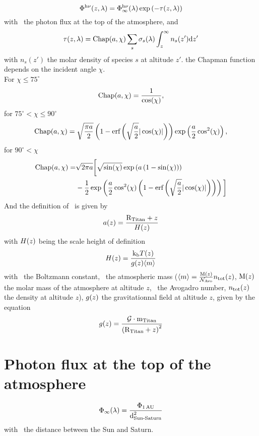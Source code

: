 \begin{equation}
\Phi^{\mathrm{h}\nu}(z,\lambda) = \Phi_\infty^{\mathrm{h}\nu}(\lambda) \exp\left(-\tau(z,\lambda)\right)
\end{equation}
with \fhvtop\ the photon flux at the top of the atmosphere, and
\begin{equation}
\tau(z,\lambda) = \text{Chap}(a,\chi)\sum_s\sigma_s(\lambda)\int_z^\infty n_s(z')\mathrm{d} z'
\end{equation}
with $n_s(z')$ the molar density of species $s$ at altitude $z'$.
the Chapman function depends on the
incident angle $\chi$.\\
For $\chi \le 75^\circ$
\begin{equation}
\text{Chap}(a,\chi) =  \frac{1}{\cos(\chi)},
\end{equation}
for $75^\circ < \chi \le 90^\circ$
\begin{equation}
\text{Chap}(a,\chi) = \sqrt{\frac{\pi a}{2}} 
                \left(1 - \text{erf}\left(\sqrt{\frac{a}{2}}|\cos(\chi)|\right)\right)\exp\left(\frac{a}{2}\cos^2(\chi)\right),
\end{equation}
for $90^\circ < \chi$
\begin{equation}
\begin{split}
\text{Chap}(a,\chi) = & \sqrt{2\pi a}\bigg[\sqrt{\sin(\chi)}\exp\left(a\left(1-\sin(\chi)\right)\right) \\
           &  -\frac{1}{2}\exp\left(\frac{a}{2}\cos^2(\chi)\left(1-\text{erf}\left(\sqrt{\frac{a}{2}}|\cos(\chi)|\right)\right)\right)\bigg]
\end{split}
\end{equation}
And the definition of \x\ is given by
\begin{equation}
a(z) = \frac{\text{R}_\text{Titan} + z}{H(z)}
\end{equation}
with $H(z)$ being the scale height of definition
\begin{equation}
H(z) = \frac{\text{k}_\text{b} T(z)}{g(z)\langle m\rangle}
\end{equation}
with \kb\ the Boltzmann constant, 
\mean{\mass}\ the atmospheric mass ($\langle m\rangle = \frac{\text{M}(z)}{\mathcal{N}_\text{Avo}}n_\text{tot}(z)$, 
$\text{M}(z)$ the molar mass of the atmosphere at altitude $z$,
\Nav\ the Avogadro number, $n_\text{tot}(z)$ the density at altitude $z$), 
$g(z)$ the gravitationnal field at altitude $z$, given by the equation
\begin{equation}
g(z) = \frac{\mathcal{G}\cdot\text{m}_\text{Titan}}{\left(\text{R}_\text{Titan} + z\right)^2}
\label{gfield}
\end{equation}

\section{Photon flux at the top of the atmosphere}
\begin{equation}
\Phi_\infty(\lambda) = \frac{\Phi_\text{1\,AU}}{\text{d}_\text{Sun-Saturn}^2}
\end{equation}
with \dSS\ the distance between the Sun and Saturn.

